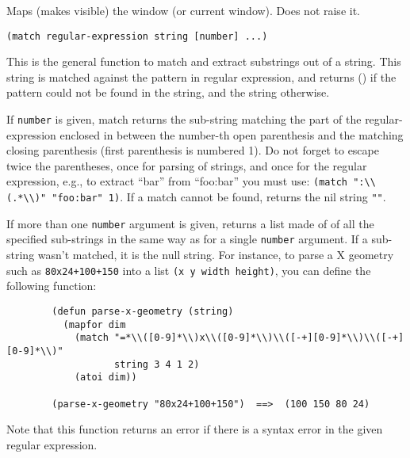 Maps (makes visible) the window (or current window). Does not raise it.

        
{\usagefont\begin{verbatim}
(match regular-expression string [number] ...)
\end{verbatim}}\usageupspace

This is the general function to match and extract substrings out of a {\WOOL}
string. This string is matched against the pattern in regular expression,
and returns () if the pattern could not be found in the string, and the
string otherwise.

If \verb"number" is given, match returns the sub-string 
matching the part of the
regular-expression enclosed in between the number-th open parenthesis and
the matching closing  parenthesis (first parenthesis is numbered 1). Do not
forget to escape twice the parentheses, once for {\GWM} parsing of strings, and
once for the regular expression, e.g., to extract ``bar'' from ``foo:bar'' you
must use: \verb|(match ":\\(.*\\)" "foo:bar" 1)|. If a match cannot be found,
returns the nil string \verb|""|.

If more than one \verb"number" argument is given, returns a list made of
of all the specified sub-strings in the same way as for a single \verb"number"
argument. If a sub-string wasn't matched, it is the null string.
For instance, to parse a X geometry such as \verb"80x24+100+150"
into a list \verb"(x y width height)", you can define the following function:

{\exemplefont\begin{verbatim}
        (defun parse-x-geometry (string)
          (mapfor dim                   
            (match "=*\\([0-9]*\\)x\\([0-9]*\\)\\([-+][0-9]*\\)\\([-+][0-9]*\\)" 
                   string 3 4 1 2)
            (atoi dim))
        
        (parse-x-geometry "80x24+100+150")  ==>  (100 150 80 24)
\end{verbatim}}

Note that this function returns an error if there is a syntax error in
the given regular expression.

